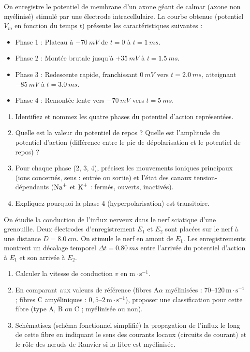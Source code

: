 \documentclass[11pt]{article}
\begin{document}
\begin{exercice}
On enregistre le potentiel de membrane d'un axone géant de calmar (axone non myélinisé) stimulé par une électrode intracellulaire. La courbe obtenue (potentiel $V_m$ en fonction du temps $t$) présente les caractéristiques suivantes :
\begin{itemize}
    \item Phase 1 : Plateau à $-\SI{70}{mV}$ de $t=0$ à $t=\SI{1}{ms}$.
    \item Phase 2 : Montée brutale jusqu'à $+\SI{35}{mV}$ à $t=\SI{1,5}{ms}$.
    \item Phase 3 : Redescente rapide, franchissant $\SI{0}{mV}$ vers $t=\SI{2,0}{ms}$, atteignant $-\SI{85}{mV}$ à $t=\SI{3,0}{ms}$.
    \item Phase 4 : Remontée lente vers $-\SI{70}{mV}$ vers $t=\SI{5}{ms}$.
\end{itemize}
\begin{enumerate}
    \item Identifiez et nommez les quatre phases du potentiel d'action représentées.
    \item Quelle est la valeur du potentiel de repos ? Quelle est l'amplitude du potentiel d'action (différence entre le pic de dépolarisation et le potentiel de repos) ?
    \item Pour chaque phase (2, 3, 4), précisez les mouvements ioniques principaux (ions concernés, sens : entrée ou sortie) et l'état des canaux tension-dépendants ($\ce{Na+}$ et $\ce{K+}$ : fermés, ouverts, inactivés).
    \item Expliquez pourquoi la phase 4 (hyperpolarisation) est transitoire.
\end{enumerate}
\end{exercice}

\begin{exercice}
On étudie la conduction de l'influx nerveux dans le nerf sciatique d'une grenouille. Deux électrodes d'enregistrement $E_1$ et $E_2$ sont placées sur le nerf à une distance $D = \SI{8,0}{cm}$. On stimule le nerf en amont de $E_1$. Les enregistrements montrent un décalage temporel $\Delta t = \SI{0,80}{ms}$ entre l'arrivée du potentiel d'action à $E_1$ et son arrivée à $E_2$.
\begin{enumerate}
    \item Calculer la vitesse de conduction $v$ en $\text{m}\cdot\text{s}^{-1}$.
    \item En comparant aux valeurs de référence (fibres A$\alpha$ myélinisées : $70\text{--}120\,\text{m}\cdot\text{s}^{-1}$ ; fibres C amyéliniques : $0,5\text{--}2\,\text{m}\cdot\text{s}^{-1}$), proposer une classification pour cette fibre (type A, B ou C ; myélinisée ou non).
    \item Schématisez (schéma fonctionnel simplifié) la propagation de l'influx le long de cette fibre en indiquant le sens des courants locaux (circuits de courant) et le rôle des nœuds de Ranvier si la fibre est myélinisée.
\end{enumerate}
\end{exercice}
\end{document}
